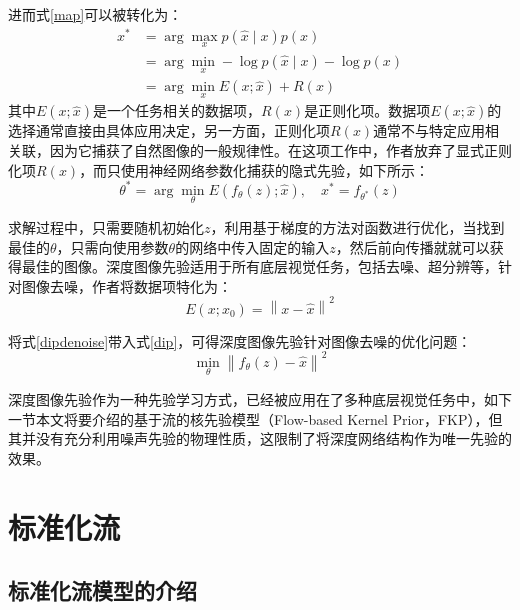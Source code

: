进而式\ref{map}可以被转化为：
\begin{equation}
	\begin{aligned}
		x^* & =\arg \max _x p(\hat{x} \mid x) p(x) \\
		& =\arg \min _x-\log p(\hat{x} \mid x)-\log p(x) \\
		& =\arg \min _x E(x ; \hat{x})+R(x)
	\end{aligned}
\end{equation}
其中$E(x ; \hat{x})$是一个任务相关的数据项，$R(x)$是正则化项。数据项$E(x ; \hat{x})$的选择通常直接由具体应用决定，另一方面，正则化项$R(x)$通常不与特定应用相关联，因为它捕获了自然图像的一般规律性。在这项工作中，作者放弃了显式正则化项$R(x)$，而只使用神经网络参数化捕获的隐式先验，如下所示：
\begin{equation}
	\theta^*=\arg \min _\theta E\left(f_\theta(z) ; \hat{x}\right), \quad x^*=f_{\theta^*}(z)
	\label{dip}
\end{equation}

求解过程中，只需要随机初始化$z$，利用基于梯度的方法对函数进行优化，当找到最佳的$\theta$，只需向使用参数$θ$的网络中传入固定的输入$z$，然后前向传播就就可以获得最佳的图像。深度图像先验适用于所有底层视觉任务，包括去噪、超分辨等，针对图像去噪，作者将数据项特化为：
\begin{equation}
	E\left(x ; x_0\right)=\left\|x-\hat{x}\right\|^2
	\label{dipdenoise}
\end{equation}

将式\ref{dipdenoise}带入式\ref{dip}，可得深度图像先验针对图像去噪的优化问题：
\begin{equation}
	\min _\theta\left\|f_\theta(z)-\hat{x}\right\|^2
\end{equation}

深度图像先验作为一种先验学习方式，已经被应用在了多种底层视觉任务中，如下一节本文将要介绍的基于流的核先验模型（Flow-based Kernel Prior，FKP）\cite{fkp}，但其并没有充分利用噪声先验的物理性质，这限制了将深度网络结构作为唯一先验的效果。

\section{标准化流}

\subsection{标准化流模型的介绍}

